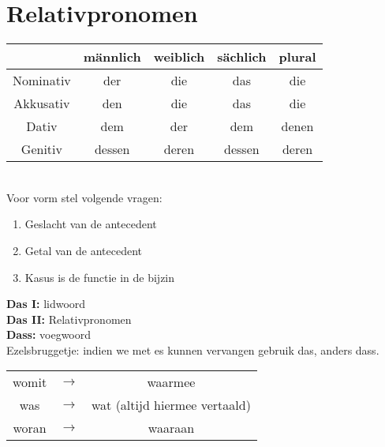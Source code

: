 \documentclass[main.tex]{subfiles}
\begin{document}
\section{Relativpronomen}
\begin{tabular}{|c|c|c|c|c|}
\hline 
\rowcolor{gray}
& männlich & weiblich & sächlich & plural \\ 
\hline 
\cellcolor[gray]{0.8}Nominativ & der & die & das & die \\ 
\hline 
\cellcolor[gray]{0.8}Akkusativ & den & die & das & die \\ 
\hline 
\cellcolor[gray]{0.8}Dativ & dem & der & dem & denen \\ 
\hline 
\cellcolor[gray]{0.8}Genitiv & dessen & deren & dessen & deren \\ 
\hline 
\end{tabular} \\
Voor vorm stel volgende vragen:
\begin{enumerate}
\item Geslacht van de antecedent
\item Getal van de antecedent
\item Kasus is de functie in de bijzin
\end{enumerate}

\textbf{Das I:} lidwoord\\
\textbf{Das II:} Relativpronomen\\
\textbf{Dass:} voegwoord\\
Ezelsbruggetje: indien we met es kunnen vervangen gebruik das, anders dass.\\

\begin{tabular}{ccc}
womit & $\rightarrow$ & waarmee \\ 
was & $\rightarrow$ & wat (altijd hiermee vertaald) \\ 
woran & $\rightarrow$ & waaraan \\ 
\end{tabular} \\
\end{document}
